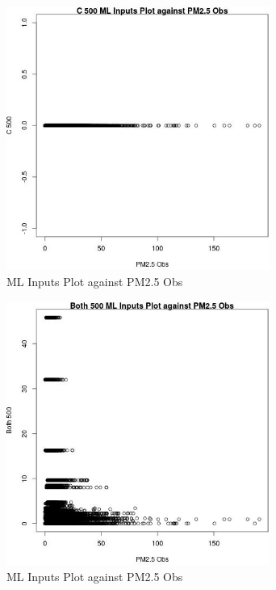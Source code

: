 \begin{figure} 
\centering  
\includegraphics[width=0.77\textwidth]{Code_Outputs/Report_ML_input_PM25_Step4_part_e_de_duplicated_aves_C_500vPM25_Obs.jpg} 
\caption{\label{fig:Report_ML_input_PM25_Step4_part_e_de_duplicated_avesC_500vPM25_Obs}ML Inputs Plot against PM2.5 Obs} 
\end{figure} 
 

\begin{figure} 
\centering  
\includegraphics[width=0.77\textwidth]{Code_Outputs/Report_ML_input_PM25_Step4_part_e_de_duplicated_aves_Both_500vPM25_Obs.jpg} 
\caption{\label{fig:Report_ML_input_PM25_Step4_part_e_de_duplicated_avesBoth_500vPM25_Obs}ML Inputs Plot against PM2.5 Obs} 
\end{figure} 
 

